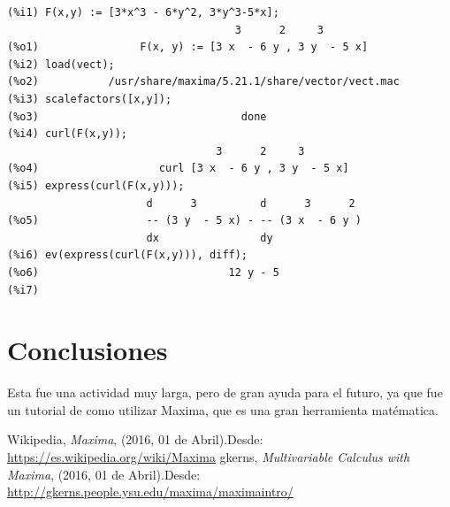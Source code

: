\documentclass[12pt,letterpaper]{article}
\begin{document}
\begin{verbatim}
(%i1) F(x,y) := [3*x^3 - 6*y^2, 3*y^3-5*x];
                                    3      2     3
(%o1)                F(x, y) := [3 x  - 6 y , 3 y  - 5 x]
(%i2) load(vect);
(%o2)           /usr/share/maxima/5.21.1/share/vector/vect.mac
(%i3) scalefactors([x,y]);
(%o3)                                done
(%i4) curl(F(x,y));
                                 3      2     3
(%o4)                   curl [3 x  - 6 y , 3 y  - 5 x]
(%i5) express(curl(F(x,y)));
                      d      3          d      3      2
(%o5)                 -- (3 y  - 5 x) - -- (3 x  - 6 y )
                      dx                dy
(%i6) ev(express(curl(F(x,y))), diff);
(%o6)                              12 y - 5
(%i7) 
\end{verbatim}




\section*{Conclusiones}
Esta fue una actividad muy larga, pero de gran ayuda para el futuro, ya que fue un tutorial de como utilizar Maxima, que es una gran herramienta matématica.

\begin{thebibliography}{widestlabel}
       Wikipedia, \emph{Maxima}, (2016, 01 de Abril).Desde: \url{https://es.wikipedia.org/wiki/Maxima}
       gkerns, \emph{Multivariable Calculus with Maxima}, (2016, 01 de Abril).Desde: \url{http://gkerns.people.ysu.edu/maxima/maximaintro/}
\end{thebibliography}
\end{document}
